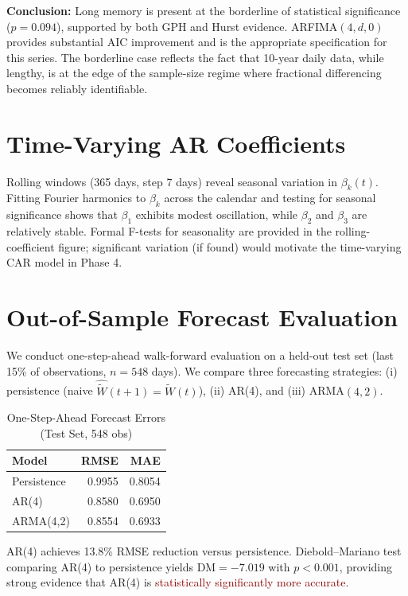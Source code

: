 \documentclass[11pt]{article}
\newcommand{\alert}[1]{\textcolor{darkred}{#1}}
\begin{document}
\textbf{Conclusion:} Long memory is present at the borderline of statistical significance ($p = 0.094$), supported by both GPH and Hurst evidence. ARFIMA$(4, d, 0)$ provides substantial AIC improvement and is the appropriate specification for this series. The borderline case reflects the fact that 10-year daily data, while lengthy, is at the edge of the sample-size regime where fractional differencing becomes reliably identifiable.

\section{Time-Varying AR Coefficients}

Rolling windows (365 days, step 7 days) reveal seasonal variation in $\beta_k(t)$. Fitting Fourier harmonics to $\beta_k$ across the calendar and testing for seasonal significance shows that $\beta_1$ exhibits modest oscillation, while $\beta_2$ and $\beta_3$ are relatively stable. Formal F-tests for seasonality are provided in the rolling-coefficient figure; significant variation (if found) would motivate the time-varying CAR model in Phase 4.

\section{Out-of-Sample Forecast Evaluation}

We conduct one-step-ahead walk-forward evaluation on a held-out test set (last 15\% of observations, $n = 548$ days). We compare three forecasting strategies: (i) persistence (naive $\hat{\widetilde{W}}(t+1) = \widetilde{W}(t)$), (ii) AR(4), and (iii) ARMA$(4,2)$.

\begin{table}[h]
\centering
\caption{One-Step-Ahead Forecast Errors (Test Set, 548 obs)}
\label{tab:forecast}
\begin{tabular}{lrr}
\toprule
\textbf{Model} & \textbf{RMSE} & \textbf{MAE} \\
\midrule
Persistence & 0.9955 & 0.8054 \\
AR(4) & 0.8580 & 0.6950 \\
ARMA(4,2) & 0.8554 & 0.6933 \\
\bottomrule
\end{tabular}
\end{table}

AR(4) achieves 13.8\% RMSE reduction versus persistence. Diebold--Mariano test comparing AR(4) to persistence yields $\text{DM} = -7.019$ with $p < 0.001$, providing strong evidence that AR(4) is \alert{statistically significantly more accurate}.
\end{document}
